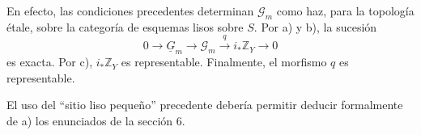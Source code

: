 En efecto, las condiciones precedentes determinan $\mathcal G_m$ como
haz, para la topología étale, sobre la categoría de esquemas lisos
sobre $S$. Por a) y b), la sucesión
\[
 0\longrightarrow\underline G_m\longrightarrow\mathcal G_m
 \xrightarrow{\ q\ }i_*\mathbb Z_Y\longrightarrow0
\]
es exacta. Por c), $i_*\mathbb Z_Y$ es representable. Finalmente, el
morfismo $q$ es representable.

El uso del ``sitio liso pequeño'' precedente debería permitir deducir
formalmente de a) los enunciados de la sección 6.


